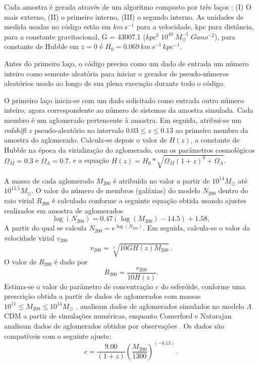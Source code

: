 Cada amostra é gerada através de um algoritmo composto por três laços : (I) O mais externo, (II) o primeiro interno, (III) o segundo interno. As unidades de medida usadas no código estão em $km \, s^{-1}$ para a velocidade, kpc para distância, para a constante gravitacional, G = 43007.1 ($kpc^3 \;10^{10}\; M_{\odot}^{-1}\; Gano^{-2}$), para constante de Hubble em $z=0$ é $H_0 = 0.069 \, km \, s^{-1} \, kpc^{-1}$.

Antes do primeiro laço, o código precisa como um dado de entrada um número inteiro como semente aleatória para iniciar o gerador de pseudo-números aleatórios usado ao longo de sua plena execução durante todo o código. 

O primeiro laço inicia-se com um dado solicitado como entrada outro número inteiro, agora correspondente ao número de sistemas da amostra simulada. Cada membro é um aglomerado pertencente à amostra. Em seguida, atribui-se um \textit{redshift} $z$ pseudo-aleatório no intervalo $0.03 \leq z \leq 0.13$ ao primeiro membro da amostra do aglomerado. Calcula-se depois o valor de $H(z)$, a constante de Hubble na época da virialização do aglomerado, com os parâmetros cosmológicos $\Omega_M = 0.3$ e $\Omega_{\Lambda}=0.7$, e a equação $H(z) = H_0*\sqrt{\Omega_M(1+z)^3 + \Omega_{\Lambda}}$.

A massa de cada aglomerado $M_{200}$ é atribuída no valor a partir de $10^{14} M_{\odot}$ até $10^{15.5}M_{\odot}$. O valor do número de membros (galáxias) do modelo $N_{200}$ dentro do raio virial $R_{200}$ é calculado conforme a seguinte equação obtida usando ajustes realizados em amostra de aglomerados \cite{andreon2012}
\begin{equation}
\log(N_{200}) = 0.47(\log(M_{200}) - 14.5) + 1.58,
\label{andreon}	
\end{equation}	
A partir do qual se calcula $N_{200} = e^{\log(N_{200})}$. Em seguida, calcula-se o valor da velocidade virial $v_{200}$\cite{springel1999}
\begin{equation}
v_{200} = \sqrt[3]{10GH(z)M_{200}} \, .
\label{velocidadevirial}
\end{equation}	
O valor de $R_{200}$ é dado por 
\begin{equation} R_{200} = \frac{v_{200}}{10H(z)}.
\label{rvirial}
\end{equation}
Estima-se o valor do parâmetro de concentração $c$ do esferóide, conforme uma prescrição obtida a partir de dados de aglomerados com massas $10^{11} \leq M_{200} \leq 10^{14} M_{\odot}$ \cite{Bullock}.  analisam dados de aglomerados simulados no modelo $\Lambda$CDM \cite{Bullock} a partir de simulações numéricas, enquanto Comerford e Natarajan analisam dados de aglomerados obtidos por observa\c c\~oes \cite{COMERFORD}. Os dados são compatíveis com o seguinte ajuste:
\begin{equation}
c = \frac{9.00}{(1+z)} \left(\frac{M_{200}}{1300}\right)^{(-0.13)} \, .	
\label{cparameter}
\end{equation}

